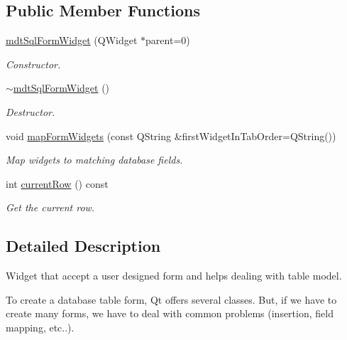 \subsection*{Public Member Functions}
\begin{DoxyCompactItemize}
\item 
\hypertarget{classmdt_sql_form_widget_a53570f49eac1a7fa490546497c88ad13}{
\hyperlink{classmdt_sql_form_widget_a53570f49eac1a7fa490546497c88ad13}{mdtSqlFormWidget} (QWidget $\ast$parent=0)}
\label{classmdt_sql_form_widget_a53570f49eac1a7fa490546497c88ad13}

\begin{DoxyCompactList}\small\item\em Constructor. \end{DoxyCompactList}\item 
\hypertarget{classmdt_sql_form_widget_a38df8efea5c216ea2b6f047e3280aac5}{
\hyperlink{classmdt_sql_form_widget_a38df8efea5c216ea2b6f047e3280aac5}{$\sim$mdtSqlFormWidget} ()}
\label{classmdt_sql_form_widget_a38df8efea5c216ea2b6f047e3280aac5}

\begin{DoxyCompactList}\small\item\em Destructor. \end{DoxyCompactList}\item 
void \hyperlink{classmdt_sql_form_widget_ace4f7fad749a4efe1233b61d071b3926}{mapFormWidgets} (const QString \&firstWidgetInTabOrder=QString())
\begin{DoxyCompactList}\small\item\em Map widgets to matching database fields. \end{DoxyCompactList}\item 
int \hyperlink{classmdt_sql_form_widget_a9588fdc58b30440077b8dcfa3a2fb3c0}{currentRow} () const 
\begin{DoxyCompactList}\small\item\em Get the current row. \end{DoxyCompactList}\end{DoxyCompactItemize}


\subsection{Detailed Description}
Widget that accept a user designed form and helps dealing with table model. 

To create a database table form, Qt offers several classes. But, if we have to create many forms, we have to deal with common problems (insertion, field mapping, etc..).


